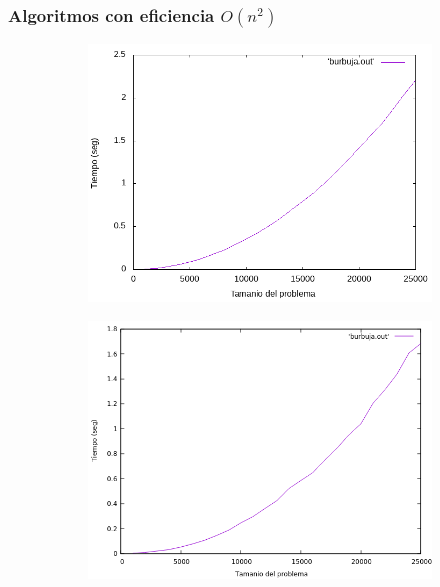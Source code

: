 \documentclass[12pt,spanish]{article}
\begin{document}
\subsubsection{Algoritmos con eficiencia $O(n^2)$}
\begin{figure}[H]
\centering
\begin{subfigure}[b]{0.45\textwidth}
\includegraphics[scale=0.45]{empirica_burbuja.png}
\caption{}
\end{subfigure}
\quad
\begin{subfigure}[b]{0.45\textwidth}
\includegraphics[scale=0.45]{empirica_burbuja_2.png}
\caption{}
\end{subfigure}
\begin{tabular}{|c|c|c|}

\end{tabular}
\end{figure}
\end{document}
